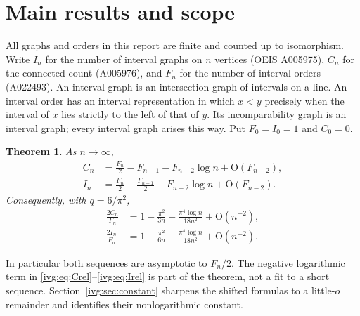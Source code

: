 \documentclass[11pt,letterpaper]{article}
\newtheorem{theorem}{Theorem}[section]
\theoremstyle{definition}\newtheorem{definition}[theorem]{Definition}
\theoremstyle{remark}\newtheorem{remark}[theorem]{Remark}
\newcommand{\OO}{\mathrm O}
\begin{document}
\section{Main results and scope}
All graphs and orders in this report are finite and counted up to isomorphism. Write $I_n$ for the number of interval graphs on $n$ vertices (OEIS A005975), $C_n$ for the connected count (A005976), and $F_n$ for the number of interval orders (A022493). An interval graph is an intersection graph of intervals on a line. An interval order has an interval representation in which $x<y$ precisely when the interval of $x$ lies strictly to the left of that of $y$. Its incomparability graph is an interval graph; every interval graph arises this way. Put $F_0=I_0=1$ and $C_0=0$.

\begin{theorem}\label{ivg:thm:main}
As $n\to\infty$,
\begin{align}
 C_n&=\frac{F_n}{2}-F_{n-1}-F_{n-2}\log n+\OO(F_{n-2}),\label{ivg:eq:C}\\
 I_n&=\frac{F_n}{2}-\frac{F_{n-1}}{2}-F_{n-2}\log n+\OO(F_{n-2}).\label{ivg:eq:I}
\end{align}
Consequently, with $q=6/\pi^2$,
\begin{align}
 \frac{2C_n}{F_n}&=1-\frac{\pi^2}{3n}-\frac{\pi^4\log n}{18n^2}+\OO(n^{-2}),\label{ivg:eq:Crel}\\
 \frac{2I_n}{F_n}&=1-\frac{\pi^2}{6n}-\frac{\pi^4\log n}{18n^2}+\OO(n^{-2}).\label{ivg:eq:Irel}
\end{align}
\end{theorem}
In particular both sequences are asymptotic to $F_n/2$. The negative logarithmic term in \eqref{ivg:eq:Crel}--\eqref{ivg:eq:Irel} is part of the theorem, not a fit to a short sequence. Section~\ref{ivg:sec:constant} sharpens the shifted formulas to a little-$o$ remainder and identifies their nonlogarithmic constant.
\end{document}
